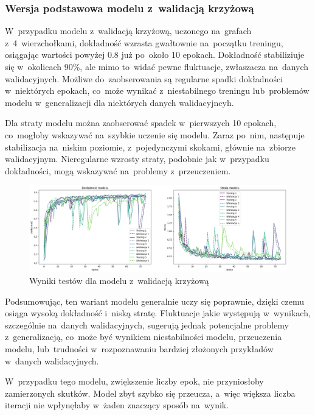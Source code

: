 \subsubsection{Wersja podstawowa modelu z~walidacją krzyżową}

W~przypadku modelu z~walidacją krzyżową, uczonego na~grafach z~4~wierzchołkami,
dokładność wzrasta gwałtownie na~początku treningu,
osiągając wartości powyżej 0.8 już po~około 10 epokach.
Dokładność stabiliziuje się w~okolicach 90\%, ale mimo to~widać pewne fluktuacje, zwłaszacza na~danych walidacyjnych.
Możliwe do~zaobserowania są regularne spadki dokładności w~niektórych epokach,
co~może wynikać z~niestabilnego treningu lub~problemów modelu w~generalizacji dla niektórych danych walidacyjncyh.

Dla straty modelu można zaobserować spadek w~pierwszych 10 epokach, co~mogłoby wskazywać na~szybkie uczenie się modelu.
Zaraz po~nim, następuje stabilizacja na~niskim poziomie, z~pojedynczymi skokami, głównie na~zbiorze walidacyjnym.
Nieregularne wzrosty straty, podobnie jak w~przypadku dokładności, mogą wskazywać na~problemy z~przeuczeniem.

\begin{figure}[ht]
	\centering
	\includegraphics[width=15.5cm]{resources/tests/images/v3/crossvalid_img.png}
	\caption{Wyniki testów dla modelu z~walidacją krzyżową}
	\label{Fig:tests-cv-0a}
\end{figure}
\FloatBarrier

Podsumowując, ten wariant modelu generalnie uczy się poprawnie, dzięki czemu osiąga wysoką dokładność i~niską stratę.
Fluktuacje jakie występują w~wynikach, szczególnie na~danych walidacyjnych,
sugerują jednak potencjalne problemy z~generalizacją, co~może być wynikiem niestabilności modelu,
przeuczenia modelu, lub~trudności w~rozpoznawaniu bardziej złożonych przykładów w~danych walidacyjnych.

W~przypadku tego modelu, zwiększenie liczby epok, nie przyniosłoby zamierzonych skutków.
Model zbyt szybko się przeucza, a~więc większa liczba iteracji nie wpłynęłaby w~żaden znaczący sposób na~wynik.

